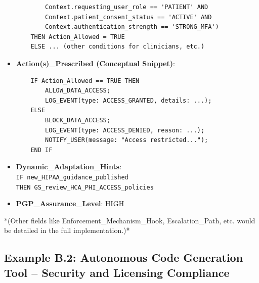 \documentclass[sigconf,review,anonymous=false]{acmart} %
\begin{document}
\begin{itemize}
{\begin{verbatim}
        Context.requesting_user_role == 'PATIENT' AND
        Context.patient_consent_status == 'ACTIVE' AND
        Context.authentication_strength == 'STRONG_MFA')
    THEN Action_Allowed = TRUE
    ELSE ... (other conditions for clinicians, etc.)
    \end{verbatim}
    }
    \item \textbf{Action(s)\_Prescribed (Conceptual Snippet)}:
    {\footnotesize
    \begin{verbatim}
    IF Action_Allowed == TRUE THEN
        ALLOW_DATA_ACCESS;
        LOG_EVENT(type: ACCESS_GRANTED, details: ...);
    ELSE
        BLOCK_DATA_ACCESS;
        LOG_EVENT(type: ACCESS_DENIED, reason: ...);
        NOTIFY_USER(message: "Access restricted...");
    END IF
    \end{verbatim}
    }
    \item \textbf{Dynamic\_Adaptation\_Hints}: \\
    \texttt{IF new\_HIPAA\_guidance\_published} \\
    \texttt{THEN GS\_review\_HCA\_PHI\_ACCESS\_policies}
    \item \textbf{PGP\_Assurance\_Level}: HIGH
\end{itemize}
*(Other fields like Enforcement\_Mechanism\_Hook, Escalation\_Path, etc. would be detailed in the full implementation.)*

\subsection{Example B.2: Autonomous Code Generation Tool – Security and Licensing Compliance}
\label{app:policy_example_codegen}
\end{document}
